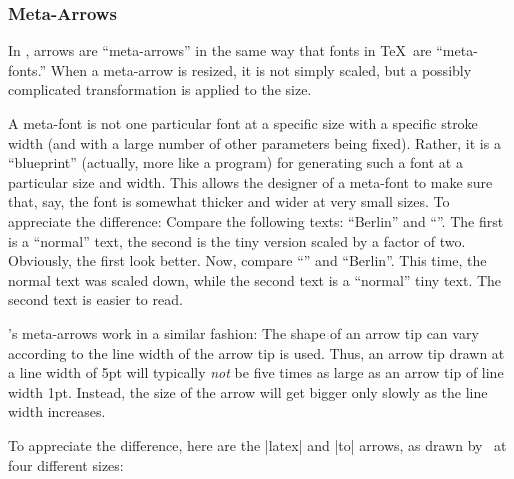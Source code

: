 \subsubsection{Meta-Arrows}

In \pgfname, arrows are ``meta-arrows'' in the same way that fonts in
\TeX\ are ``meta-fonts.'' When a meta-arrow is resized, it is not
simply scaled, but a possibly complicated transformation is applied to
the size.

A meta-font is not one particular font at a specific size with a
specific stroke width (and with a large number of other parameters
being fixed). Rather, it is a ``blueprint'' (actually, more like a
program) for generating such a font at a particular size and
width. This allows the designer of a meta-font to make sure that, say,
the font is somewhat thicker and wider at very small sizes. To
appreciate the difference: Compare the following texts: ``Berlin'' and
``''. The first is a ``normal'' text, the second is the tiny
version scaled by a factor of two. Obviously, the first look
better. Now, compare  ``'' and ``{\tiny Berlin}''. This time, the normal
text was scaled down, while the second text is a ``normal'' tiny
text. The second text is easier to read. 

\pgfname's meta-arrows work in a similar fashion: The shape of an
arrow tip can vary according to the line width of the arrow tip is
used. Thus, an arrow tip drawn at a line width of 5pt will typically
\emph{not} be five times as large as an arrow tip of line width
1pt. Instead, the size of the arrow will get bigger only slowly as the
line width increases.

To appreciate the difference, here are the |latex| and |to| arrows, as
drawn by \pgfname\ at four different sizes:

\medskip
{}

